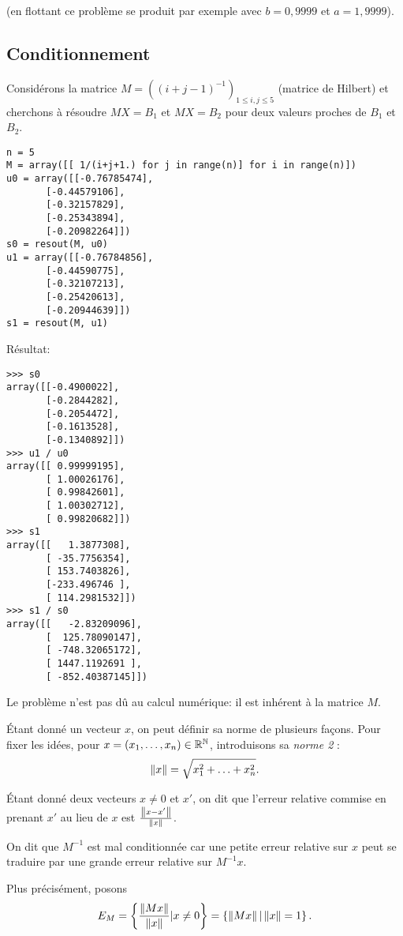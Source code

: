 (en flottant ce problème se produit par exemple avec $b=0,9999$ et
$a=1,9999$).

\subsection{Conditionnement}

Considérons la matrice $M = ((i+j-1)^{-1})_{1\leq i,j\leq 5}$ (matrice
de Hilbert) et
cherchons à résoudre $MX = B_{1}$ et $MX = B_{2}$ pour deux valeurs
proches de $B_{1}$ et $B_{2}$.
\begin{lstlisting}
n = 5
M = array([[ 1/(i+j+1.) for j in range(n)] for i in range(n)])
u0 = array([[-0.76785474],
       [-0.44579106],
       [-0.32157829],
       [-0.25343894],
       [-0.20982264]])
s0 = resout(M, u0)
u1 = array([[-0.76784856],
       [-0.44590775],
       [-0.32107213],
       [-0.25420613],
       [-0.20944639]])
s1 = resout(M, u1)
\end{lstlisting}

Résultat:
\begin{lstlisting}
>>> s0
array([[-0.4900022],
       [-0.2844282],
       [-0.2054472],
       [-0.1613528],
       [-0.1340892]])
>>> u1 / u0
array([[ 0.99999195],
       [ 1.00026176],
       [ 0.99842601],
       [ 1.00302712],
       [ 0.99820682]])
>>> s1
array([[   1.3877308],
       [ -35.7756354],
       [ 153.7403826],
       [-233.496746 ],
       [ 114.2981532]])
>>> s1 / s0
array([[   -2.83209096],
       [  125.78090147],
       [ -748.32065172],
       [ 1447.1192691 ],
       [ -852.40387145]])
\end{lstlisting}

Le problème  n'est pas dû  au calcul numérique:  il est inhérent  à la
matrice $M$.

Étant donné un vecteur $x$, on peut définir sa norme de
plusieurs façons. Pour fixer les idées, pour $x = (x_{1}, \ldots,
x_{n})\in \mathbb{R}^{\mathbb{N}}$, introduisons sa \emph{norme 2} :
\begin{equation*}
 \left\Vert {x}\right\Vert  = \sqrt{x_{1}^{2}+\ldots+x_{n}^{2}}.
\end{equation*}


Étant donné deux vecteurs $x\neq 0$ et $x'$, on dit que l'erreur
relative commise en prenant $x'$ au lieu de $x$ est
$\frac{\left\Vert {x-x'}\right\Vert}{\left\Vert {x}\right\Vert}$.

On dit que $M^{-1}$ est mal conditionnée car une petite erreur relative sur
$x$ peut se traduire par une grande erreur relative sur $M^{-1}x$.

Plus précisément, posons
\begin{equation*}
  E_{M} = \left\{\frac{\left\Vert {Mx}\right\Vert}{\left\Vert {x}\right\Vert} | x\neq 0\right\} = \left\{\left\Vert {Mx}\right\Vert |
    \left\Vert {x}\right\Vert = 1\right\}.
\end{equation*}

